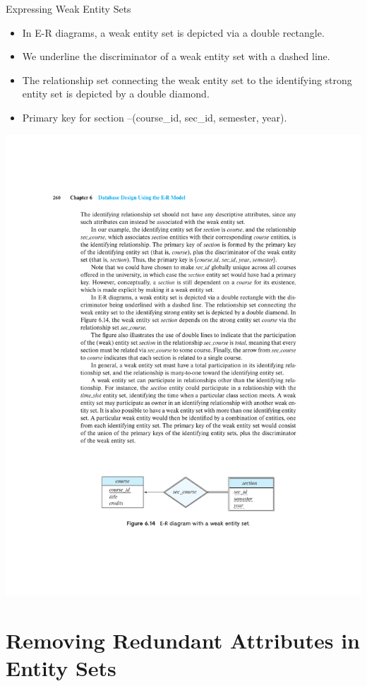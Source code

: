 \documentclass{beamer}
\begin{document}
\begin{frame}{Expressing Weak Entity Sets}
    \begin{itemize}
        \item In E-R diagrams, a weak entity set is depicted via a double rectangle.
        \item We underline the discriminator of a weak entity set with a dashed line.
        \item The relationship set connecting the weak entity set to the identifying strong entity set is depicted by a double diamond.
        \item Primary key for section --(course\_id, sec\_id, semester, year).
    \end{itemize}
    \centering
    \includegraphics[trim={5cm 4.5cm 5cm 19.5cm}, clip, width=\textwidth]{figures/p260}
\end{frame}

\section{Removing Redundant Attributes in Entity Sets}
\end{document}
